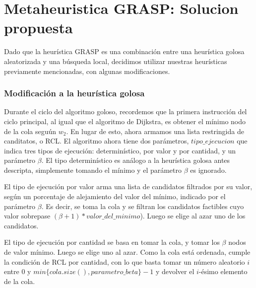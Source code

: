 \section{Metaheuristica GRASP: Solucion propuesta}

Dado que la heur\'istica GRASP es una combinaci\'on entre una heur\'istica golosa aleatorizada y una b\'usqueda local, decidimos utilizar nuestras heur\'isticas previamente mencionadas, con algunas modificaciones.

\subsubsection{Modificaci\'on a la heur\'istica golosa}

\vspace{2mm}

Durante el ciclo del algoritmo goloso, recordemos que la primera instrucci\'on del ciclo principal, al igual que el algoritmo de Dijkstra, es obtener el m\'inimo nodo de la cola segu\'un $w_2$. En lugar de esto, ahora armamos una lista restringida de canditatos, o RCL. El algoritmo ahora tiene dos par\'ametros, $tipo\_ejecucion$ que indica tres tipos de ejecuci\'on: determin\'istico, por valor y por cantidad, y un par\'ametro $\beta$. El tipo determin\'istico es an\'alogo a la heur\'istica golosa antes descripta, simplemente tomando el m\'inimo y el par\'ametro $\beta$ es ignorado.

\vspace{2mm}

El tipo de ejecuci\'on por valor arma una lista de candidatos filtrados por su valor, seg\'un un porcentaje de alejamiento del valor del m\'inimo, indicado por el par\'ametro $\beta$. Es decir, se toma la cola y se filtran los candidatos factibles cuyo valor sobrepase $(\beta + 1)*valor\_del\_minimo$). Luego se elige al azar uno de los candidatos.

\vspace{2mm}

El tipo de ejecuci\'on por cantidad se basa en tomar la cola, y tomar los $\beta$ nodos de valor m\'inimo. Luego se elige uno al azar. Como la cola est\'a ordenada, cumple la condici\'on de RCL por cantidad, con lo que basta tomar un n\'umero aleatorio $i$ entre $0$ y  $min\{cola.size(), parametro\_beta\} -1$ y devolver el $i$-\'esimo elemento de la cola.

\vspace{2mm}

